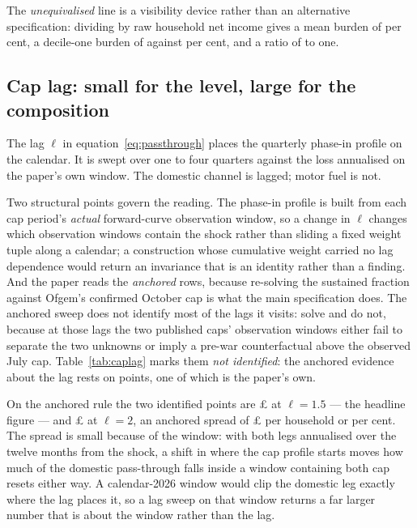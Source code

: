 The \emph{unequivalised} line is a visibility device rather than an alternative specification: dividing by raw household net income gives a mean burden of \genUnequivLossPctIncome{} per cent, a decile-one burden of \genUnequivDecileOneLossPct{} against \genUnequivDecileTenLossPct{} per cent, and a ratio of \genUnequivDecileRatioPct{} to one.

\begin{table}[htbp]
\centering
\caption{The calibrations of the realised 2026 scenario compared: the main specification, the steady-state accounting basis, symmetric damping, the peak-fuel upper bound, the two ONS calibrations, and the unequivalised robustness line.}
\label{tab:variants}

\end{table}

\subsection{Cap lag: small for the level, large for the composition}
\label{app:caplag}

The lag $\ell$ in equation~\eqref{eq:passthrough} places the quarterly phase-in profile on the calendar. It is swept over one to four quarters against the loss annualised on the paper's own window. The domestic channel is lagged; motor fuel is not.

Two structural points govern the reading. The phase-in profile is built from each cap period's \emph{actual} forward-curve observation window, so a change in $\ell$ changes which observation windows contain the shock rather than sliding a fixed weight tuple along a calendar; a construction whose cumulative weight carried no lag dependence would return an invariance that is an identity rather than a finding. And the paper reads the \emph{anchored} rows, because re-solving the sustained fraction against Ofgem's confirmed October cap is what the main specification does. The anchored sweep does not identify most of the lags it visits: \genCapLagAnchoredIdentifiedCount{} solve and \genCapLagAnchoredNonIdentifiedCount{} do not, because at those lags the two published caps' observation windows either fail to separate the two unknowns or imply a pre-war counterfactual above the observed July cap. Table~\ref{tab:caplag} marks them \emph{not identified}: the anchored evidence about the lag rests on \genCapLagAnchoredIdentifiedCount{} points, one of which is the paper's own.

On the anchored rule the two identified points are \pounds\genCapLagAnnualisedLagOnePointFiveAnchored{} at $\ell = 1.5$ --- the headline figure --- and \pounds\genCapLagAnnualisedLagTwoAnchored{} at $\ell = 2$, an anchored spread of \pounds \genCapLagRangeGbp{} per household or \genCapLagSpreadPct{} per cent. The spread is small because of the window: with both legs annualised over the twelve months from the shock, a shift in where the cap profile starts moves how much of the domestic pass-through falls inside a window containing both cap resets either way. A calendar-2026 window would clip the domestic leg exactly where the lag places it, so a lag sweep on that window returns a far larger number that is about the window rather than the lag.

